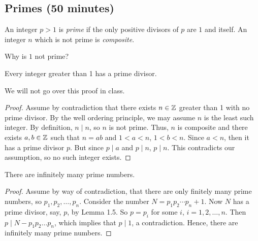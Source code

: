 \documentclass{ximera}
\begin{document}
\subsection{Primes (50 minutes)}
\begin{defn}
An integer $p>1$ is \emph{prime} if the only positive divisors of $p$ are $1$ and itself. An integer $n$ which is not prime is \emph{composite}. 
\end{defn}

Why is $1$ not prime?


\begin{lem*}[Lemma 1.5]
 Every integer greater than 1 has a prime divisor.
\end{lem*}

We will not go over this proof in class.

\begin{proof} 
 Assume by contradiction that there exists $n\in\mathbb Z$ greater than 1 with no prime divisor. By the well ordering principle, we may assume $n$ is the least such integer. By definition, $n\mid n$, so $n$ is not prime. Thus, $n$ is composite and there exists $a,b\in\mathbb Z$ such that $n=ab$ and $1<a<n$, $1<b<n$. Since $a<n$, then it has a prime divisor $p$. But since $p\mid a$ and $p\mid n$, $p\mid n$. This contradicts our assumption, so no such integer exists.
\end{proof}


\begin{thm*}
 There are infinitely many prime numbers.
\end{thm*}
\begin{proof}
 Assume by way of contradiction, that there are only finitely many prime numbers, so $p_1,p_2,\dots,p_n$. Consider the number $N=p_1p_2\cdots p_n +1$. Now $N$ has a prime divisor, say, $p$, by Lemma 1.5. So $p=p_i$ for some $i$, $i=1,2,\dots,n$. Then $p\mid N-p_1p_2\dots p_n$, which implies that $p\mid 1$, a contradiction. Hence, there are infinitely many prime numbers.
\end{proof}
\end{document}
